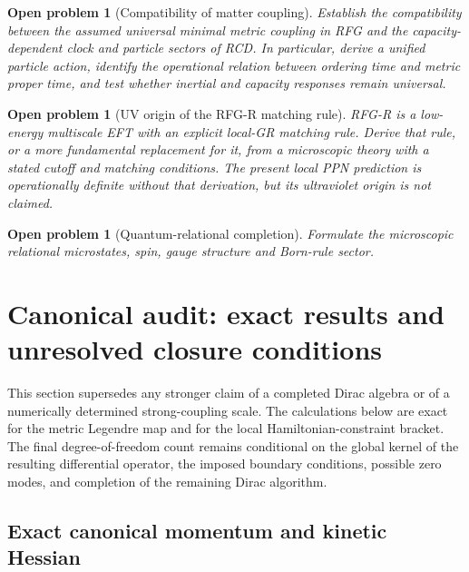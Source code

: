 \documentclass[11pt,a4paper]{article}
\newtheorem{openproblem}[axiom]{Open problem}
\begin{document}
\begin{openproblem}[Compatibility of matter coupling]
Establish the compatibility between the assumed universal minimal metric coupling in RFG and the capacity-dependent clock and particle sectors of RCD. In particular, derive a unified particle action, identify the operational relation between ordering time and metric proper time, and test whether inertial and capacity responses remain universal.
\end{openproblem}

\begin{openproblem}[UV origin of the RFG-R matching rule]
RFG-R is a low-energy multiscale EFT with an explicit local-GR matching rule. Derive that rule, or a more fundamental replacement for it, from a microscopic theory with a stated cutoff and matching conditions. The present local PPN prediction is operationally definite without that derivation, but its ultraviolet origin is not claimed.
\end{openproblem}

\begin{openproblem}[Quantum-relational completion]
Formulate the microscopic relational microstates, spin, gauge structure and Born-rule sector.
\end{openproblem}



\section{Canonical audit: exact results and unresolved closure conditions}
\label{sec:canonical-audit}

This section supersedes any stronger claim of a completed Dirac algebra or of a
numerically determined strong-coupling scale. The calculations below are exact
for the metric Legendre map and for the local Hamiltonian-constraint bracket.
The final degree-of-freedom count remains conditional on the global kernel of
the resulting differential operator, the imposed boundary conditions, possible
zero modes, and completion of the remaining Dirac algorithm.

\subsection{Exact canonical momentum and kinetic Hessian}
\end{document}
